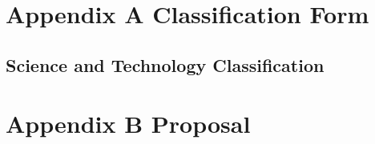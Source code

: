 \documentclass[
  12pt,
  oneside]{book}
\begin{document}
\hypertarget{appendix-a-classification-form}{%
\chapter*{Appendix A Classification Form}\label{appendix-a-classification-form}}


\hypertarget{science-and-technology-classification}{%
\section*{Science and Technology Classification}\label{science-and-technology-classification}}

\hypertarget{appendix-b-proposal}{%
\chapter*{Appendix B Proposal}\label{appendix-b-proposal}}

\enddocument

\printbibliography
\end{document}
